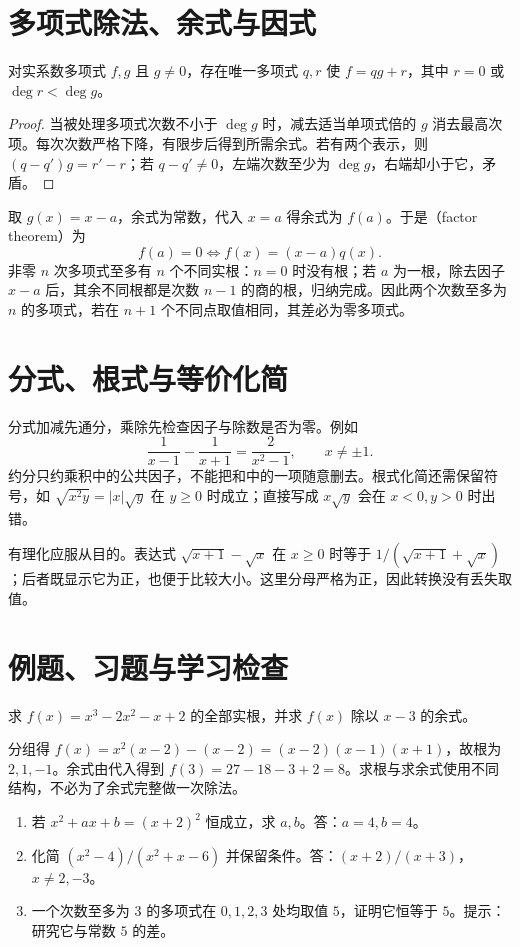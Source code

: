 \documentclass[UTF8]{ctexbook}
\begin{document}
\section{多项式除法、余式与因式}
\begin{theorem}[多项式带余除法]
对实系数多项式 $f,g$ 且 $g\ne0$，存在唯一多项式 $q,r$ 使 $f=qg+r$，其中 $r=0$ 或 $\deg r<\deg g$。
\end{theorem}
\begin{proof}
当被处理多项式次数不小于 $\deg g$ 时，减去适当单项式倍的 $g$ 消去最高次项。每次次数严格下降，有限步后得到所需余式。若有两个表示，则 $(q-q')g=r'-r$；若 $q-q'\ne0$，左端次数至少为 $\deg g$，右端却小于它，矛盾。
\end{proof}
取 $g(x)=x-a$，余式为常数，代入 $x=a$ 得余式为 $f(a)$。于是（factor theorem）为
\begin{equation}\label{eq:em-factor}
 f(a)=0\Longleftrightarrow f(x)=(x-a)q(x).
\end{equation}
非零 $n$ 次多项式至多有 $n$ 个不同实根：$n=0$ 时没有根；若 $a$ 为一根，除去因子 $x-a$ 后，其余不同根都是次数 $n-1$ 的商的根，归纳完成。因此两个次数至多为 $n$ 的多项式，若在 $n+1$ 个不同点取值相同，其差必为零多项式。

\section{分式、根式与等价化简}
分式加减先通分，乘除先检查因子与除数是否为零。例如
\[
 \frac1{x-1}-\frac1{x+1}=\frac2{x^2-1},\qquad x\ne\pm1.
\]
约分只约乘积中的公共因子，不能把和中的一项随意删去。根式化简还需保留符号，如 $\sqrt{x^2y}=|x|\sqrt y$ 在 $y\ge0$ 时成立；直接写成 $x\sqrt y$ 会在 $x<0,y>0$ 时出错。

有理化应服从目的。表达式 $\sqrt{x+1}-\sqrt x$ 在 $x\ge0$ 时等于 $1/(\sqrt{x+1}+\sqrt x)$；后者既显示它为正，也便于比较大小。这里分母严格为正，因此转换没有丢失取值。

\section{例题、习题与学习检查}
\begin{example}
求 $f(x)=x^3-2x^2-x+2$ 的全部实根，并求 $f(x)$ 除以 $x-3$ 的余式。
\end{example}
\begin{solve}
分组得 $f(x)=x^2(x-2)-(x-2)=(x-2)(x-1)(x+1)$，故根为 $2,1,-1$。余式由代入得到 $f(3)=27-18-3+2=8$。求根与求余式使用不同结构，不必为了余式完整做一次除法。
\end{solve}
\begin{enumerate}
\item 若 $x^2+ax+b=(x+2)^2$ 恒成立，求 $a,b$。答：$a=4,b=4$。
\item 化简 $(x^2-4)/(x^2+x-6)$ 并保留条件。答：$(x+2)/(x+3)$，$x\ne2,-3$。
\item 一个次数至多为 $3$ 的多项式在 $0,1,2,3$ 处均取值 $5$，证明它恒等于 $5$。提示：研究它与常数 $5$ 的差。
\end{enumerate}
\end{document}
